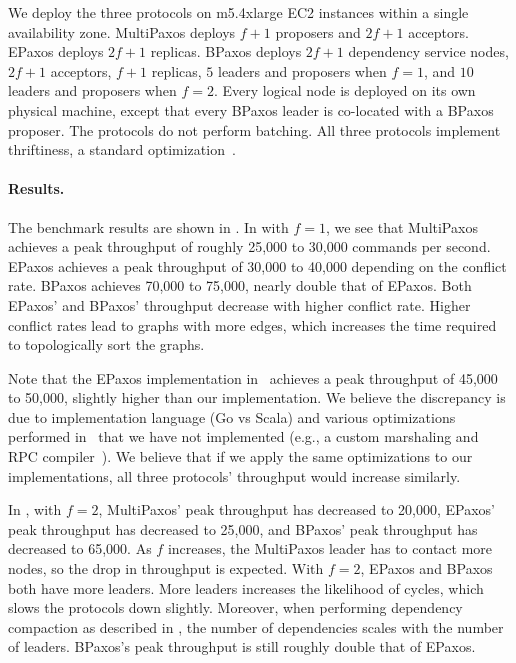 We deploy the three protocols on m5.4xlarge EC2 instances within a single
availability zone. MultiPaxos deploys $f+1$ proposers and $2f+1$ acceptors.
EPaxos deploys $2f+1$ replicas. BPaxos deploys $2f+1$ dependency service nodes,
$2f+1$ acceptors, $f+1$ replicas, $5$ leaders and proposers when $f=1$, and
$10$ leaders and proposers when $f=2$. Every logical node is deployed on its
own physical machine, except that every BPaxos leader is co-located with a
BPaxos proposer. The protocols do not perform batching. All three protocols
implement thriftiness, a standard optimization~\cite{moraru2013there}.


\paragraph{Results.}
The benchmark results are shown in . In  with
$f=1$, we see that MultiPaxos achieves a peak throughput of roughly 25,000 to
30,000 commands per second. EPaxos achieves a peak throughput of 30,000 to
40,000 depending on the conflict rate. BPaxos achieves 70,000 to 75,000,
nearly double that of EPaxos. Both EPaxos' and BPaxos' throughput decrease with
higher conflict rate. Higher conflict rates lead to graphs with more edges,
which increases the time required to topologically sort the graphs.

Note that the EPaxos implementation in~\cite{moraru2013there} achieves a peak
throughput of 45,000 to 50,000, slightly higher than our implementation. We
believe the discrepancy is due to implementation language (Go vs Scala) and
various optimizations performed in~\cite{moraru2013there} that we have not
implemented (e.g., a custom marshaling and RPC compiler~\cite{epaxos2019blog}).
We believe that if we apply the same optimizations to our implementations, all
three protocols' throughput would increase similarly.

In , with $f=2$, MultiPaxos' peak throughput has decreased to
20,000, EPaxos' peak throughput has decreased to 25,000, and BPaxos' peak
throughput has decreased to 65,000. As $f$ increases, the MultiPaxos leader has
to contact more nodes, so the drop in throughput is expected. With $f=2$,
EPaxos and BPaxos both have more leaders. More leaders increases the likelihood
of cycles, which slows the protocols down slightly. Moreover, when performing
dependency compaction as described in , the
number of dependencies scales with the number of leaders. BPaxos's peak
throughput is still roughly double that of EPaxos.

